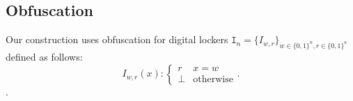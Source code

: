\documentclass[11pt]{article}
\newcommand{\defref}[1]{\mbox{Definition~\ref{#1}}}
\newcommand{\class}[1]{{\ensuremath{\mathsf{#1}}}}
\newcommand{\zo}{\ensuremath{\{0, 1\}}}
\newcommand{\neigh}{\ensuremath{\class{Neigh}}\xspace}
\newcommand{\decode}{\ensuremath{\mathsf{Decode}}}
\newtheorem{definition}[theorem]{Definition}
\begin{document}
%
%

\subsection{Obfuscation}
Our construction uses obfuscation for digital lockers $\mathtt{I}_n = \{I_{w, r}\}_{w \in \zo^n, r\in\zo^\kappa}$ defined as follows:
\[
I_{w, r}(x):\begin{cases} r & x=w\\\perp & \text{otherwise}\end{cases}.
\].  
\end{document}
